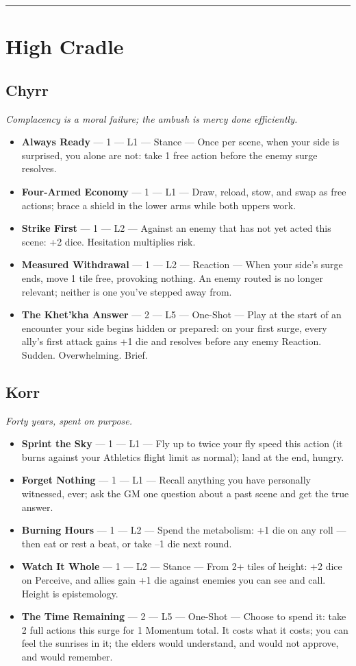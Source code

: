 \medskip\hrule\medskip

\section{High Cradle}

\subsection{Chyrr}
\textit{Complacency is a moral failure; the ambush is mercy done efficiently.}
\begin{itemize}
    \item \textbf{Always Ready} --- 1 --- L1 --- Stance --- Once per scene, when your side is surprised, you alone are not: take 1 free action before the enemy surge resolves.
    \item \textbf{Four-Armed Economy} --- 1 --- L1 --- Draw, reload, stow, and swap as free actions; brace a shield in the lower arms while both uppers work.
    \item \textbf{Strike First} --- 1 --- L2 --- Against an enemy that has not yet acted this scene: +2 dice. Hesitation multiplies risk.
    \item \textbf{Measured Withdrawal} --- 1 --- L2 --- Reaction --- When your side's surge ends, move 1 tile free, provoking nothing. An enemy routed is no longer relevant; neither is one you've stepped away from.
    \item \textbf{The Khet'kha Answer} --- 2 --- L5 --- One-Shot --- Play at the start of an encounter your side begins hidden or prepared: on your first surge, every ally's first attack gains +1 die and resolves before any enemy Reaction. Sudden. Overwhelming. Brief.
\end{itemize}

\subsection{Korr}
\textit{Forty years, spent on purpose.}
\begin{itemize}
    \item \textbf{Sprint the Sky} --- 1 --- L1 --- Fly up to twice your fly speed this action (it burns against your Athletics flight limit as normal); land at the end, hungry.
    \item \textbf{Forget Nothing} --- 1 --- L1 --- Recall anything you have personally witnessed, ever; ask the GM one question about a past scene and get the true answer.
    \item \textbf{Burning Hours} --- 1 --- L2 --- Spend the metabolism: +1 die on any roll --- then eat or rest a beat, or take --1 die next round.
    \item \textbf{Watch It Whole} --- 1 --- L2 --- Stance --- From 2+ tiles of height: +2 dice on Perceive, and allies gain +1 die against enemies you can see and call. Height is epistemology.
    \item \textbf{The Time Remaining} --- 2 --- L5 --- One-Shot --- Choose to spend it: take 2 full actions this surge for 1 Momentum total. It costs what it costs; you can feel the sunrises in it; the elders would understand, and would not approve, and would remember.
\end{itemize}

